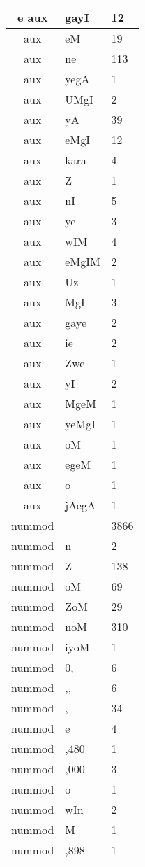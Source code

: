\documentclass[a4 paper]{article}
\begin{document}
\begin{longtable}{cp{}p{}}
e aux & gayI & 12\\ \midrule aux & eM & 19\\ \midrule aux & ne & 113\\ \midrule aux & yegA & 1\\ \midrule aux & UMgI & 2\\ \midrule aux & yA & 39\\ \midrule aux & eMgI & 12\\ \midrule aux & kara & 4\\ \midrule aux & Z & 1\\ \midrule aux & nI & 5\\ \midrule aux & ye & 3\\ \midrule aux & wIM & 4\\ \midrule aux & eMgIM & 2\\ \midrule aux & Uz & 1\\ \midrule aux & MgI & 3\\ \midrule aux & gaye & 2\\ \midrule aux & ie & 2\\ \midrule aux & Zwe & 1\\ \midrule aux & yI & 2\\ \midrule aux & MgeM & 1\\ \midrule aux & yeMgI & 1\\ \midrule aux & oM & 1\\ \midrule aux & egeM & 1\\ \midrule aux & o & 1\\ \midrule aux & jAegA & 1\\ \midrule 
nummod &  & 3866\\ \midrule nummod & n & 2\\ \midrule nummod & Z & 138\\ \midrule nummod & oM & 69\\ \midrule nummod & ZoM & 29\\ \midrule nummod & noM & 310\\ \midrule nummod & iyoM & 1\\ \midrule nummod & 0, & 6\\ \midrule nummod & ,, & 6\\ \midrule nummod & , & 34\\ \midrule nummod & e & 4\\ \midrule nummod & ,480 & 1\\ \midrule nummod & ,000 & 3\\ \midrule nummod & o & 1\\ \midrule nummod & wIn & 2\\ \midrule nummod & M & 1\\ \midrule nummod & ,898 & 1\\ \midrule 

\end{longtable}
\end{document}
